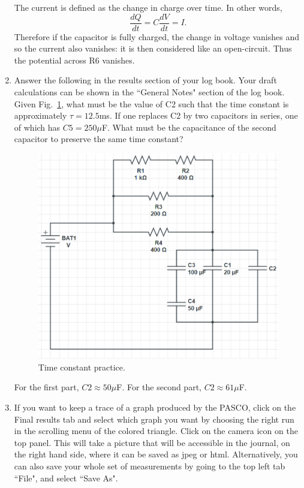 \documentclass[12pt]{report}
\begin{document}
\begin{enumerate}
\begin{tcolorbox}[title=Answer]
The current is defined as the change in charge over time. In other words,
\begin{equation}
\frac{dQ}{dt} = C \frac{dV}{dt} = I.
\end{equation}
Therefore if the capacitor is fully charged, the change in voltage vanishes and so the current also vanishes: it is then considered like an open-circuit. Thus the potential across R6 vanishes.
\end{tcolorbox}

\item Answer the following in the results section of your log book. Your draft calculations can be shown in the ``General Notes" section of the log book. Given Fig.~\ref{Fig:lab2-session1-tau-practice}, what must be the value of C2 such that the time constant is approximately $\tau=12.5$ms. If one replaces C2 by two capacitors in series, one of which has $C5=250\mu$F. What must be the capacitance of the second capacitor to preserve the same time constant?
\begin{figure}[h]
\centering
\includegraphics[width=0.6\linewidth]{lab2-session1-Cpractice}
\caption{Time constant practice.}
\label{Fig:lab2-session1-tau-practice}
\end{figure}

\begin{tcolorbox}[title=Answer]
For the first part, $C2 \approx 50\mu$F. For the second part, $C2 \approx 61\mu$F.
\end{tcolorbox}

\item If you want to keep a trace of a graph produced by the PASCO, click on the Final results tab and select which graph you want by choosing the right run in the scrolling menu of the colored triangle. Click on the camera icon on the top panel. This will take a picture that will be accessible in the journal, on the right hand side, where it can be saved as jpeg or html. Alternatively, you can also save your whole set of measurements by going to the top left tab ``File", and select ``Save As".
\end{enumerate}
\end{document}
